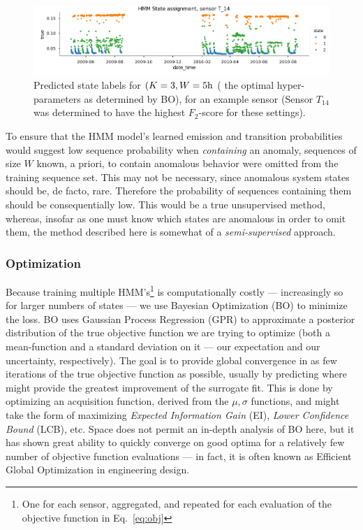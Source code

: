\documentclass[twocolumn,10pt]{article}
\begin{document}
\begin{figure}
    \centering
    \includegraphics[width=\linewidth]{img/true_hmm_state.png}
    \caption{Predicted state labels for $(K=3, W=5{\rm h}$ ( the optimal hyper-parameters as determined by BO), for an example sensor (Sensor $T_{14}$ was determined to have the highest $F_2$-score for these settings).}\label{fig:states}
\end{figure}
To ensure that the HMM model's learned emission and transition probabilities would suggest low sequence probability when \textit{containing} an anomaly, sequences of size $W$ known, a priori, to contain anomalous behavior were omitted from the training sequence set. This may not be necessary, since anomalous system states should be, de facto, rare. Therefore the probability of sequences containing them should be consequentially low. This would be a true unsupervised method, whereas, insofar as one must know which states are anomalous in order to omit them, the method described here is somewhat of a \textit{semi-supervised} approach. 

\subsubsection{Optimization}
Because training multiple HMM's\footnote{One for each sensor, aggregated, and repeated for each evaluation of the objective function in Eq.~\ref{eq:obj}}  is computationally costly --- increasingly so for larger numbers of states --- we use Bayesian Optimization (BO) to minimize the loss. BO uses Gaussian Process Regression (GPR) to approximate a posterior distribution of the true objective function we are trying to optimize (both a mean-function and a standard deviation on it --- our expectation and our uncertainty, respectively). The goal is to provide global convergence in as few iterations of the true objective function as possible, usually by predicting where might provide the greatest improvement of the surrogate fit. This is done by optimizing an acquisition function, derived from the $\mu, \sigma$ functions, and might take the form of maximizing \textit{Expected Information Gain} (EI), \textit{Lower Confidence Bound} (LCB), etc. Space does not permit an in-depth analysis of BO here, but it has shown great ability to quickly converge on good optima for a relatively few number of objective function evaluations --- in fact, it is often known as Efficient Global Optimization in engineering design.~\citep{efficient-global-opt}
\end{document}
